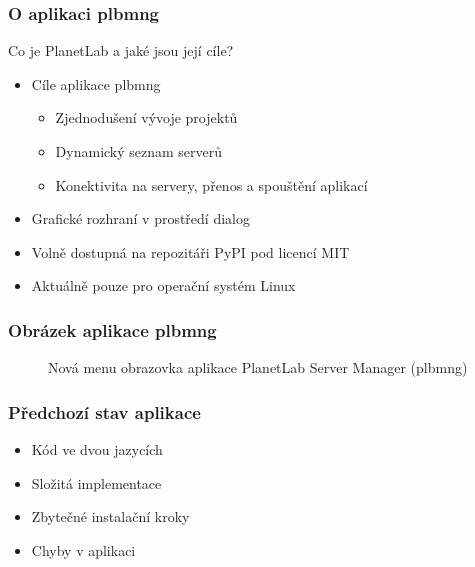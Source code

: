 \documentclass[%
  12pt,       				%
	t,                  %
	aspectratio=1610,   %
	unicode,						%
]{beamer}				    	%
\begin{document}
\begin{frame} 
\frametitle{O aplikaci plbmng}
Co je PlanetLab a jaké jsou její cíle?
\begin{itemize}
	\item Cíle aplikace plbmng
		\begin{itemize}
			\item Zjednodušení vývoje projektů
			\item Dynamický seznam serverů
			\item Konektivita na servery, přenos a spouštění aplikací
		\end{itemize}
	\item Grafické rozhraní v prostředí dialog
	\item Volně dostupná na repozitáři PyPI pod licencí MIT
	\item Aktuálně pouze pro operační systém Linux
\end{itemize}
\end{frame} 

\begin{frame} 
\frametitle{Obrázek aplikace plbmng}
\begin{figure}[H]
	\centering
	\caption{Nová menu obrazovka aplikace PlanetLab Server Manager (plbmng)}
	\label{fig:redesigned}
\end{figure}
\end{frame}

\begin{frame} 
\frametitle{Předchozí stav aplikace}
\begin{itemize}
	\item Kód ve dvou jazycích
	\item Složitá implementace
	\item Zbytečné instalační kroky
	\item Chyby v aplikaci

\end{itemize}
\end{frame} 
\end{document}
